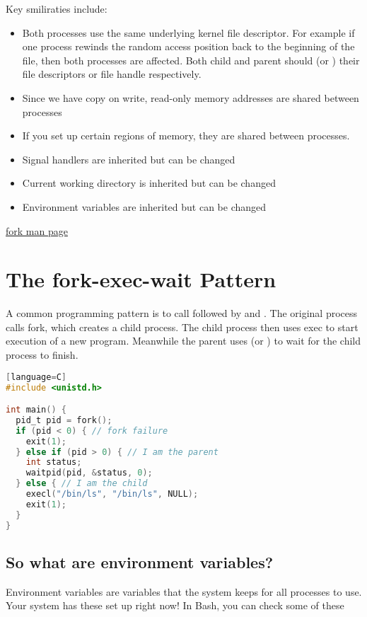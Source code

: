 Key smiliraties include:
\begin{itemize}
\item Both processes use the same underlying kernel file descriptor. For example if one process rewinds the random access position back to the beginning of the file, then both processes are affected. Both child and parent should  (or ) their file descriptors or file handle respectively.
\item Since we have copy on write, read-only memory addresses are shared between processes
\item If you set up certain regions of memory, they are shared between processes.
\item Signal handlers are inherited but can be changed
\item Current working directory is inherited but can be changed
\item Environment variables are inherited but can be changed
\end{itemize}

\href{http://linux.die.net/man/2/fork}{fork man page}

\section{The fork-exec-wait Pattern}

A common programming pattern is to call  followed by  and . The original process calls fork, which creates a child process. The child process then uses exec to start execution of a new program. Meanwhile the parent uses  (or ) to wait for the child process to finish. 

\begin{lstlisting}[language=C][language=C]
#include <unistd.h>

int main() {
  pid_t pid = fork();
  if (pid < 0) { // fork failure
    exit(1);
  } else if (pid > 0) { // I am the parent
    int status;
    waitpid(pid, &status, 0);
  } else { // I am the child
    execl("/bin/ls", "/bin/ls", NULL);
    exit(1);
  }
}
\end{lstlisting}

\subsection{So what are environment variables?}\label{so-what-are-environment-variables}

Environment variables are variables that the system keeps for all processes to use. Your system has these set up right now! In Bash, you can check some of these

